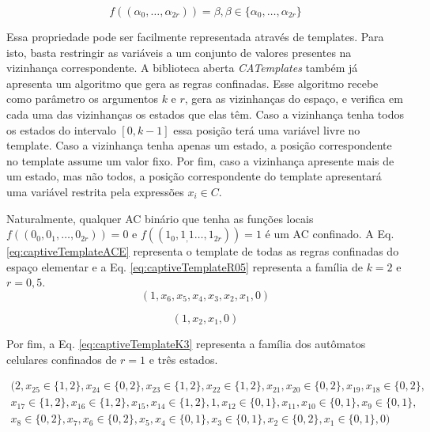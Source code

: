 \begin{equation}
f((\alpha_0, \dots, \alpha_{2r})) = \beta, \beta \in \{\alpha_0, \dots, \alpha_{2r}\}
\label{eq:captiveAC}
\end{equation}

Essa propriedade pode ser facilmente representada através de templates. Para isto, basta restringir as variáveis a um conjunto de valores presentes na vizinhança correspondente. A biblioteca aberta \textit{CATemplates} também já apresenta um algoritmo que gera as regras confinadas. Esse algoritmo recebe como parâmetro os argumentos $k$ e $r$, gera as vizinhanças do espaço, e verifica em cada uma das vizinhanças os estados que elas têm. Caso a vizinhança tenha todos os estados do intervalo $[0, k-1]$ essa posição terá uma variável livre no template. Caso a vizinhança tenha apenas um estado, a posição correspondente no template assume um valor fixo. Por fim, caso a vizinhança apresente mais de um estado, mas não todos, a posição correspondente do template apresentará uma variável restrita pela expressões $x_i \in C$.

Naturalmente, qualquer AC binário que tenha as funções locais $f((0_0, 0_1,\dots, 0_{2r})) = 0$ e $f((1_0, 1_,1\dots, 1_{2r})) = 1$ é um AC confinado. A Eq. \eqref{eq:captiveTemplateACE} representa o template de todas as regras confinadas do espaço elementar e a Eq. \eqref{eq:captiveTemplateR05} representa a família de $k=2$ e $r=0,5$.
\begin{equation}
(1,x_6,x_5,x_4,x_3,x_2,x_1,0)
\label{eq:captiveTemplateACE}
\end{equation}

\begin{equation}
(1,x_2,x_1,0)
\label{eq:captiveTemplateR05}
\end{equation}

Por fim, a Eq. \eqref{eq:captiveTemplateK3} representa a família dos autômatos celulares confinados de $r=1$ e três estados.

\begin{equation}
\begin{split}
(2, x_{25} \in \{1,2\}, x_{24} \in \{0,2\}, x_{23} \in \{1,2\}, x_{22} \in \{1,2\}, x_{21}, x_{20} \in \{0,2\}, x_{19}, x_{18} \in \{0,2\}, \\
x_{17} \in \{1,2\}, x_{16} \in \{1,2\}, x_{15}, x_{14} \in \{1,2\},1, x_{12} \in \{0,1\}, x_{11}, x_{10} \in \{0,1\}, x_9 \in \{0,1\}, \\
x_8 \in \{0,2\}, x_7, x_6 \in \{0,2\}, x_5, x_4 \in \{0,1\}, x_3 \in \{0,1\}, x_2 \in \{0,2\}, x_1 \in \{0,1\}, 0)
\label{eq:captiveTemplateK3}
\end{split}
\end{equation}

